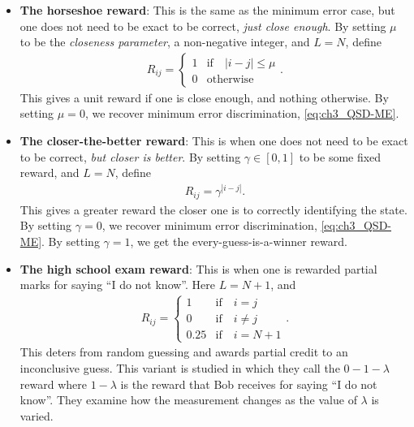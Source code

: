 \begin{itemize} 

\item \textbf{The horseshoe reward}: This is the same as the minimum error case, but one does not need to be exact to be correct, \emph{just close enough}.  
By setting $\mu$ to be the \emph{closeness parameter}, a non-negative integer, and $L = N$, define  
\begin{align}
    \label{eq:ch3_QSD-R_ME_SD}
    R_{ij} =
    \begin{cases}
        1 &\text{if} \quad |i - j| \leq \mu \\
        0 &\text{otherwise}
    \end{cases}. 
\end{align} 
This gives a unit reward if one is close enough, and nothing otherwise.  
By setting $\mu = 0$, we recover minimum error discrimination, \eqref{eq:ch3_QSD-ME}. 

\item \textbf{The closer-the-better reward}: This is when one does not need to be exact to be correct, \emph{but closer is better}.  
By setting $\gamma \in [0,1]$ to be some fixed reward, and $L = N$, define  
\begin{align}
    \label{eq:ch3_QSD-R_ME_SD}
    R_{ij} = \gamma^{|i-j|}. 
\end{align} 
This gives a greater reward the closer one is to correctly identifying the state. 
By setting $\gamma = 0$, we recover minimum error discrimination, \eqref{eq:ch3_QSD-ME}. 
By setting $\gamma = 1$, we get the every-guess-is-a-winner reward. 

\item \textbf{The high school exam reward}: This is when one is rewarded partial marks for saying ``I do not know''.  
Here $L = N+1$, and
\begin{align}
    \label{eq:ch3_QSD-R_ME_SD}
    R_{ij} =
    \begin{cases}
        1 &\text{if} \quad i = j \\ 
        0 &\text{if} \quad i \neq j \\
        0.25 & \text{if} \quad i = N+1 
    \end{cases}. 
\end{align} 
This deters from random guessing and awards partial credit to an inconclusive guess.  
This variant is studied in \cite{combes2015cost} which they call the $0-1-\lambda$ reward where $1-\lambda$ is the reward that Bob receives for saying ``I do not know''. They examine how the measurement changes as the value of $\lambda$ is varied.

\end{itemize} 

